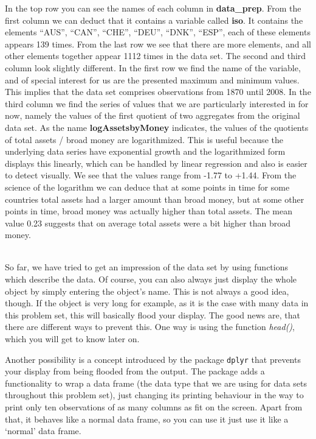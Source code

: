 \documentclass[a4paper,11pt,abstract=on]{scrartcl}
\newcommand{\infobox}[2]{\begin{mdframed}[linewidth=0.8pt, innerleftmargin = 0.8cm, innerrightmargin = 0.8cm, innertopmargin = 0.8cm, innerbottommargin = 0.8cm,skipabove=0.5cm,skipbelow=1.5cm]{
\sf{\textbf{#1} }\\  #2 
}\end{mdframed}}
\begin{document}
{In the top row you can see the names of each column in
\textbf{data\_prep}. From the first column we can deduct that it
contains a variable called \textbf{iso}. It contains the elements
``AUS'', ``CAN'', ``CHE'', ``DEU'', ``DNK'', ``ESP'', each of these
elements appears 139 times. From the last row we see that there are more
elements, and all other elements together appear 1112 times in the data
set. The second and third column look slightly different. In the first
row we find the name of the variable, and of special interest for us are
the presented maximum and minimum values. This implies that the data set
comprises observations from 1870 until 2008. In the third column we find
the series of values that we are particularly interested in for now,
namely the values of the first quotient of two aggregates from the
original data set. As the name \textbf{logAssetsbyMoney} indicates, the
values of the quotients of total assets / broad money are logarithmized.
This is useful because the underlying data series have exponential
growth and the logarithmized form displays this linearly, which can be
handled by linear regression and also is easier to detect visually. We
see that the values range from -1.77 to +1.44. From the science of the
logarithm we can deduce that at some points in time for some countries
total assets had a larger amount than broad money, but at some other
points in time, broad money was actually higher than total assets. The
mean value 0.23 suggests that on average total assets were a bit higher
than broad money.

\infobox{Info: Data frame tbl}{

So far, we have tried to get an impression of the data set by using
functions which describe the data. Of course, you can also always just
display the whole object by simply entering the object's name. This is
not always a good idea, though. If the object is very long for example,
as it is the case with many data in this problem set, this will
basically flood your display. The good news are, that there are
different ways to prevent this. One way is using the function
\emph{head()}, which you will get to know later on.

Another possibility is a concept introduced by the package
\texttt{dplyr} that prevents your display from being flooded from the
output. The package adds a functionality to wrap a data frame (the data
type that we are using for data sets throughout this problem set), just
changing its printing behaviour in the way to print only ten
observations of as many columns as fit on the screen. Apart from that,
it behaves like a normal data frame, so you can use it just use it like
a `normal' data frame.

}}
\end{document}
